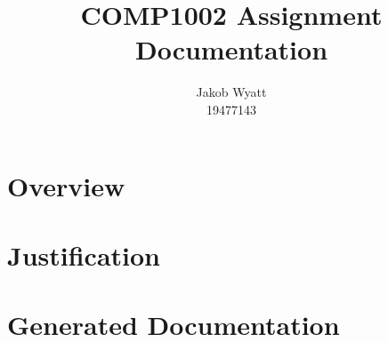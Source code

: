 \documentclass{article}
\title{COMP1002 Assignment\\Documentation}
\author{Jakob Wyatt\\19477143}
\begin{document}
\maketitle
\pagebreak
\section{Overview}
\section{Justification}
\section{Generated Documentation}
\end{document}

